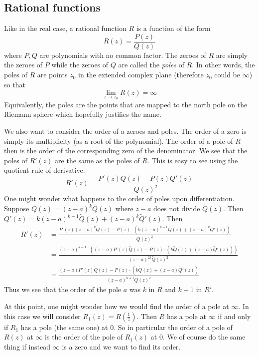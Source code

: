 \subsection{Rational functions}
Like in the real case, a rational function $R$ is a function of the form
$$R(z) = \frac{P(z)}{Q(z)}$$
where $P, Q$ are polynomials with no common factor. The zeroes of $R$ are simply the zeroes of $P$ while the zeroes of $Q$ are called the \textit{poles} of $R$. In other words, the poles of $R$ are points $z_0$ in the extended complex plane (therefore $z_0$ could be $\infty$) so that
$$\lim_{z \to z_0} R(z) = \infty$$
Equivalently, the poles are the points that are mapped to the north pole on the Riemann sphere which hopefully justifies the name. 

We also want to consider the order of a zeroes and poles. The order of a zero is simply its multiplicity (as a root of the polynomial). The order of a pole of $R$ then is the order of the corresponding zero of the denominator. We see that the poles of $R'(z)$ are the same as the poles of $R$. This is easy to see using the quotient rule of derivative.
$$ R'(z) = \frac{P'(z) Q(z) - P(z) Q'(z)}{Q(z)^2} $$
One might wonder what happens to the order of poles upon differentiation. Suppose $Q(z) = (z - a)^k \tilde{Q}(z)$ where $z - a$ does not divide $\tilde{Q}(z)$. Then $Q'(z) = k (z - a)^{k - 1} \tilde{Q}(z) + (z - a)^k \tilde{Q}'(z)$. Then
\begin{align*}
    R'(z) &= \frac{P'(z)(z - a)^k \tilde{Q}(z) - P(z) \cdot (k (z - a)^{k - 1} \tilde{Q}(z) + (z - a)^k \tilde{Q}'(z))} {Q(z)^2}\\
    &= \frac{(z - a)^{k - 1} \cdot ((z - a) P'(z)\tilde{Q}(z) - P(z) \cdot ( k\tilde{Q}(z) + (z - a)\tilde{Q}'(z)))}{(z - a)^{2k} \tilde{Q}(z)^2}\\
    &= \frac{(z - a) P'(z)\tilde{Q}(z) - P(z) \cdot (k\tilde{Q}(z) + (z - a)\tilde{Q}'(z))}{(z - a)^{k + 1} \tilde{Q}(z)^2}
\end{align*}
Thus we see that the order of the pole $a$ was $k$ in $R$ and $k + 1$ in $R'$.

At this point, one might wonder how we would find the order of a pole at $\infty$. In this case we will consider $R_1(z) = R(\frac{1}{z})$. Then $R$ has a pole at $\infty$ if and only if $R_1$ has a pole (the same one) at 0. So in particular the order of a pole of $R(z)$ at $\infty$ is the order of the pole of $R_1(z)$ at 0. We of course do the same thing if instead $\infty$ is a zero and we want to find its order.


